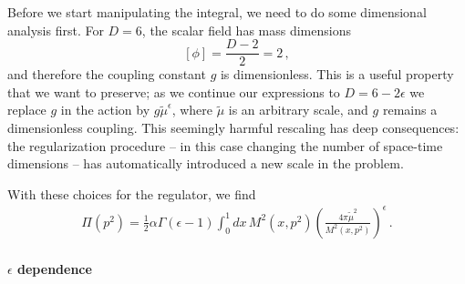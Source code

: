 Before we start manipulating the integral, we need to do some
dimensional analysis first. For $D=6$, the scalar field has mass
dimensions
\[
  \left[\phi\right] = \frac{D-2}{2}= 2\, ,
\]
and therefore the coupling constant $g$ is dimensionless. This is a
useful property that we want to preserve; as we continue our
expressions to $D=6-2\epsilon$ we replace $g$ in the action by
$g\tilde{\mu}^\epsilon$, where $\tilde{\mu}$ is an arbitrary scale,
and $g$ remains a dimensionless coupling. This seemingly harmful
rescaling has deep consequences: the regularization procedure -- in
this case changing the number of space-time dimensions -- has
automatically introduced a new scale in the problem.

With these choices for the regulator, we find
\begin{align}
  \Pi(p^2) = \frac12 \alpha \Gamma(\epsilon-1) \int_0^1dx\,
  M^2(x,p^2)
  \left(\frac{4\pi\tilde{\mu}^2}{M^2(x,p^2)}\right)^\epsilon\, .
\end{align}

\paragraph{$\epsilon$ dependence}

